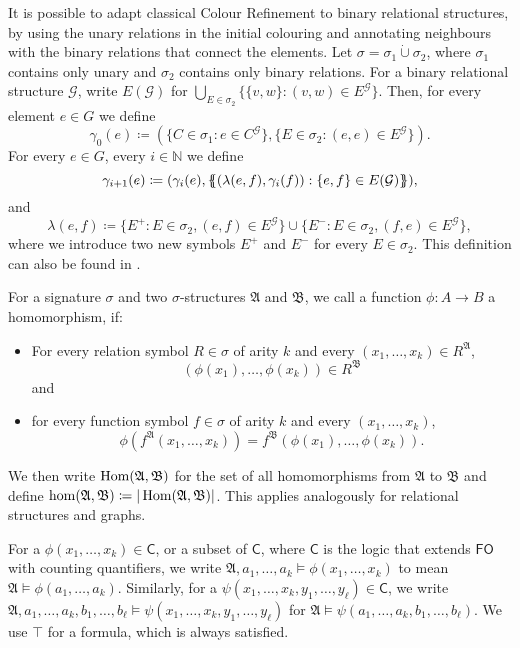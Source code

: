 It is possible to adapt classical Colour Refinement to binary relational structures, by using the unary relations in the initial colouring and annotating neighbours with the binary relations that connect the elements.
Let $\sigma=\sigma_1\operatorname{\dot{\cup}}\sigma_2$, where $\sigma_1$ contains only unary and $\sigma_2$ contains only binary relations.
For a binary relational structure $\mathcal G$, write $E(\mathcal G)$ for $\bigcup_{E\in \sigma_2} \{\{v,w \} : (v,w)\in E^{\mathcal G}\}$.
Then, for every element $e\in G$ we define
$$\gamma_0(e)\coloneqq(\{C\in \sigma_1 : e\in C^{\mathcal G}\}, \{E\in \sigma_2 : (e,e)\in E^{\mathcal G}\}).$$
For every $e\in G$, every $i\in \mathbb N$ we define 
$$\gamma_{i+1}(e)\coloneqq(\gamma_i(e), \left\{\kern-.35em\left\{(\lambda(e,f), \gamma_i(f)) : \{e,f\}\in E(\mathcal G)\right\}\kern-.35em\right\}),$$
and
$$\lambda(e,f)\coloneqq\{E^+ : E\in\sigma_2, (e,f)\in E^{\mathcal G}\} \cup \{E^- : E\in \sigma_2, (f,e)\in E^{\mathcal G}\},$$
where we introduce two new symbols $E^+$ and $E^-$ for every $E\in \sigma_2$.
This definition can also be found in \cite{scheidt2025ColorRefinement}.

For a signature $\sigma$ and two $\sigma$-structures $\mathfrak A$ and $\mathfrak B$, we call a function $\phi:A\to B$ a homomorphism, if:
\begin{itemize}
	\item For every relation symbol $R\in\sigma$ of arity $k$ and every $(x_1,\dots,x_k)\in R^{\mathfrak A}$,
	$$(\phi(x_1),\dots,\phi(x_k))\in R^{\mathfrak B}$$ 
	and
	\item for every function symbol $f\in \sigma$ of arity $k$ and every $(x_1,\dots,x_k)$, 
	$$\phi(f^{\mathfrak A}(x_1,\dots,x_k))=f^{\mathfrak B}(\phi(x_1),\dots,\phi(x_k)).$$
\end{itemize}
We then write $\operatorname{Hom}(\mathfrak A, \mathfrak B)$ for the set of all homomorphisms from $\mathfrak A$ to $\mathfrak B$ and define $\hom(\mathfrak A,\mathfrak B)\coloneqq \vert\operatorname{Hom}(\mathfrak A,\mathfrak B)\vert$.
This applies analogously for relational structures and graphs.

For a $\phi(x_1,\dots,x_k)\in\mathsf C$, or a subset of $\mathsf{C}$, where $\mathsf C$ is the logic that extends $\mathsf{FO}$ with counting quantifiers, we write $\mathfrak A,a_1,\dots,a_k\models \phi(x_1,\dots,x_k)$ to mean $\mathfrak A\models \phi(a_1,\dots,a_k)$.
Similarly, for a $\psi(x_1,\dots,x_k,y_1,\dots,y_\ell)\in\mathsf C$, we write $\mathfrak A,a_1,\dots,a_k,b_1,\dots,b_\ell\models \psi(x_1,\dots,x_k,y_1,\dots,y_\ell)$ for $\mathfrak A\models \psi(a_1,\dots,a_k,b_1,\dots,b_\ell)$.
We use $\top$ for a formula, which is always satisfied.






